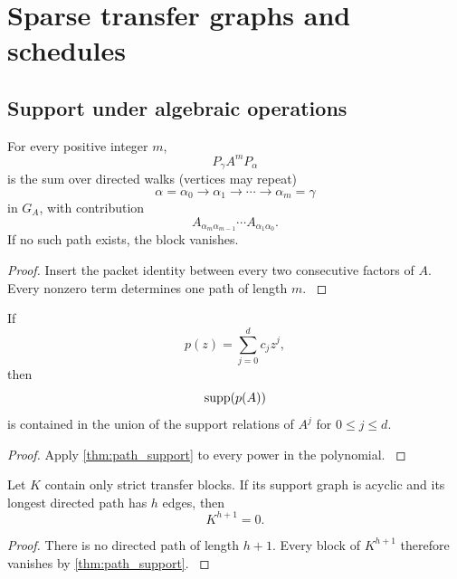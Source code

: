 \section{Sparse transfer graphs and schedules}\label{main:section:006}\label{sec:graphs}

\subsection{Support under algebraic operations}\label{main:subsection:005}

\begin{theorem}\label{main:theorem:014}\label{thm:path_support}
For every positive integer \(m\),
\[
P_\gamma A^mP_\alpha
\]
is the sum over directed walks (vertices may repeat)
\[
\alpha=\alpha_0
\longrightarrow
\alpha_1
\longrightarrow\cdots\longrightarrow
\alpha_m=\gamma
\]
in \(G_A\), with contribution
\[
A_{\alpha_m\alpha_{m-1}}
\cdots
A_{\alpha_1\alpha_0}.
\]
If no such path exists, the block vanishes.
\end{theorem}

\begin{proof}\label{main:proof:026}
Insert the packet identity between every two consecutive factors of \(A\). Every nonzero term determines one path of length \(m\).
\label{main:proof:026:end}\end{proof}

\begin{corollary}\label{main:corollary:008}\label{cor:polynomial_support}
If
\[
p(z)=\sum_{j=0}^dc_jz^j,
\]
then
\[
\operatorname{supp}(p(A))
\]
is contained in the union of the support relations of \(A^j\) for \(0\leq j\leq d\).
\end{corollary}

\begin{proof}\label{main:proof:027}
Apply \cref{thm:path_support} to every power in the polynomial.
\label{main:proof:027:end}\end{proof}

\begin{corollary}\label{main:corollary:009}\label{cor:acyclic_nilpotence}
Let \(K\) contain only strict transfer blocks. If its support graph is acyclic and its longest directed path has \(h\) edges, then
\[
K^{h+1}=0.
\]
\end{corollary}

\begin{proof}\label{main:proof:028}
There is no directed path of length \(h+1\). Every block of \(K^{h+1}\) therefore vanishes by \cref{thm:path_support}.
\label{main:proof:028:end}\end{proof}

